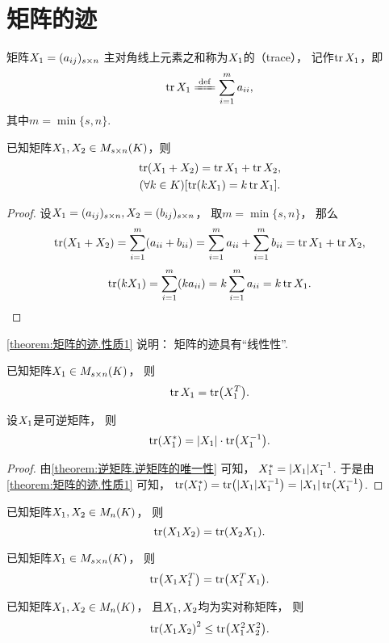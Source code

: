 \section{矩阵的迹}
\begin{definition}
矩阵\(X_1=(a_{ij})_{s \times n}\)
主对角线上元素之和称为\(X_1\)的（trace），
记作\(\tr X_1\)，即\[
	\tr\A \defeq \sum_{i=1}^m a_{ii},
\]
其中\(m = \min\{s,n\}\).
\end{definition}

\begin{property}\label{theorem:矩阵的迹.性质1}
已知矩阵\(X_1,X_2 \in M_{s \times n}(K)\)，则
\begin{gather}
	\tr(X_1+X_2) = \tr X_1 + \tr X_2, \\
	(\forall k \in K)[\tr(k X_1) = k \tr X_1].
\end{gather}
\begin{proof}
设\(X_1=(a_{ij})_{s \times n},
X_2=(b_{ij})_{s \times n}\)，
取\(m = \min\{s,n\}\)，
那么\[
	\tr(X_1+X_2) = \sum_{i=1}^m (a_{ii}+b_{ii})
	= \sum_{i=1}^m a_{ii}
	+ \sum_{i=1}^m b_{ii}
	= \tr X_1 + \tr X_2,
\]\[
	\tr(k X_1) = \sum_{i=1}^m (k a_{ii})
	= k \sum_{i=1}^m a_{ii}
	= k \tr X_1.
	\qedhere
\]
\end{proof}
\end{property}
\cref{theorem:矩阵的迹.性质1} 说明：
矩阵的迹具有“线性性”.

\begin{property}\label{theorem:矩阵的迹.性质2}
已知矩阵\(X_1 \in M_{s \times n}(K)\)，
则\begin{equation}
	\tr X_1 = \tr(X_1^T).
\end{equation}
\end{property}

\begin{property}
设\(X_1\)是可逆矩阵，
则\begin{equation}
	\tr(X_1^*) = \abs{X_1} \cdot \tr(X_1^{-1}).
\end{equation}
\begin{proof}
由\cref{theorem:逆矩阵.逆矩阵的唯一性} 可知，
\(X_1^* = \abs{X_1} X_1^{-1}\).
于是由\cref{theorem:矩阵的迹.性质1} 可知，
\(\tr(X_1^*) = \tr(\abs{X_1} X_1^{-1}) = \abs{X_1} \tr(X_1^{-1})\).
\end{proof}
\end{property}

\begin{property}\label{theorem:矩阵的迹.矩阵乘积交换次序不变迹}
已知矩阵\(X_1,X_2 \in M_n(K)\)，
则\begin{equation}
	\tr(X_1X_2) = \tr(X_2X_1).
\end{equation}
\end{property}

\begin{property}
已知矩阵\(X_1 \in M_{s \times n}(K)\)，
则\begin{equation}
	\tr(X_1X_1^T) = \tr(X_1^TX_1).
\end{equation}
\end{property}

\begin{property}
已知矩阵\(X_1,X_2 \in M_n(K)\)，
且\(X_1,X_2\)均为实对称矩阵，
则\begin{equation}
	\tr(X_1X_2)^2 \leq \tr(X_1^2X_2^2).
\end{equation}
\end{property}
